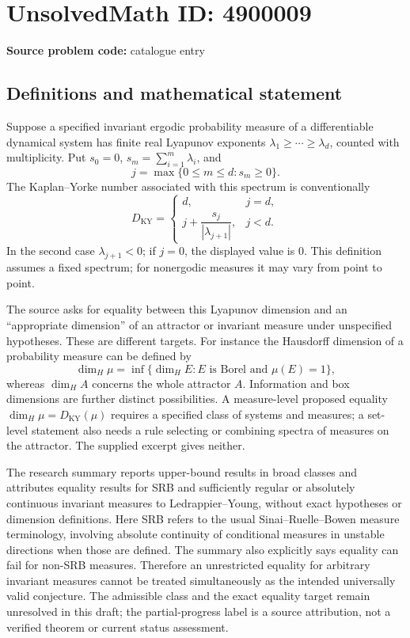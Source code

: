 \documentclass[11pt]{article}
\begin{document}
\section*{UnsolvedMath ID: 4900009}
\textbf{Source problem code:} catalogue entry
\subsection{Definitions and mathematical statement}
Suppose a specified invariant ergodic probability measure of a differentiable dynamical system has finite real Lyapunov exponents \(\lambda_1\ge\cdots\ge\lambda_d\), counted with multiplicity. Put \(s_0=0\), \(s_m=\sum_{i=1}^m\lambda_i\), and
\[
 j=\max\{0\le m\le d:s_m\ge0\}.
\]
The Kaplan--Yorke number associated with this spectrum is conventionally
\[
 D_{\mathrm{KY}}=\begin{cases}
 d,&j=d,\\
 j+\dfrac{s_j}{|\lambda_{j+1}|},&j<d.
 \end{cases}
\]
In the second case \(\lambda_{j+1}<0\); if \(j=0\), the displayed value is \(0\). This definition assumes a fixed spectrum; for nonergodic measures it may vary from point to point.

The source asks for equality between this Lyapunov dimension and an ``appropriate dimension'' of an attractor or invariant measure under unspecified hypotheses. These are different targets. For instance the Hausdorff dimension of a probability measure can be defined by
\[
 \dim_H\mu=\inf\{\dim_H E:E\text{ is Borel and }\mu(E)=1\},
\]
whereas \(\dim_H A\) concerns the whole attractor \(A\). Information and box dimensions are further distinct possibilities. A measure-level proposed equality \(\dim_H\mu=D_{\mathrm{KY}}(\mu)\) requires a specified class of systems and measures; a set-level statement also needs a rule selecting or combining spectra of measures on the attractor. The supplied excerpt gives neither.

The research summary reports upper-bound results in broad classes and attributes equality results for SRB and sufficiently regular or absolutely continuous invariant measures to Ledrappier--Young, without exact hypotheses or dimension definitions. Here SRB refers to the usual Sinai--Ruelle--Bowen measure terminology, involving absolute continuity of conditional measures in unstable directions when those are defined. The summary also explicitly says equality can fail for non-SRB measures. Therefore an unrestricted equality for arbitrary invariant measures cannot be treated simultaneously as the intended universally valid conjecture. The admissible class and the exact equality target remain unresolved in this draft; the partial-progress label is a source attribution, not a verified theorem or current status assessment.
\end{document}
